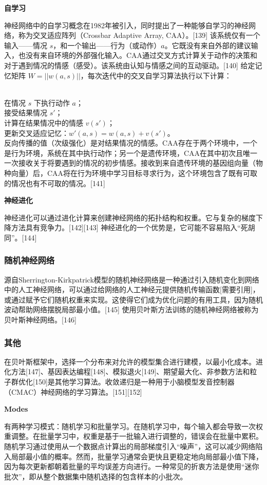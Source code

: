 \textbf{自学习}  

神经网络中的自学习概念在1982年被引入，同时提出了一种能够自学习的神经网络，称为交叉适应阵列（Crossbar Adaptive Array, CAA）。[139] 该系统仅有一个输入——情况 \( s \)，和一个输出——行为（或动作）\( a \)。它既没有来自外部的建议输入，也没有来自环境的外部强化输入。CAA通过交叉方式计算关于动作的决策和对于遇到情况的情感（感受）。该系统由认知与情感之间的互动驱动。[140] 给定记忆矩阵 \( W = ||w(a, s)|| \)，每次迭代中的交叉自学习算法执行以下计算：

\\在情况 \( s \) 下执行动作 \( a \)；\\
接受结果情况 \( s' \)；\\
计算在结果情况中的情感 \( v(s') \)；\\
更新交叉适应记忆：\( w'(a, s) = w(a, s) + v(s') \)。\\

反向传播的值（次级强化）是对结果情况的情感。CAA存在于两个环境中，一个是行为环境，系统在其中执行动作；另一个是遗传环境，CAA在其中初次且唯一一次接收关于将要遇到的情况的初步情感。接收到来自遗传环境的基因组向量（物种向量）后，CAA将在行为环境中学习目标寻求行为，这个环境包含了既有可取的情况也有不可取的情况。[141]

\textbf{神经进化}  
 
神经进化可以通过进化计算来创建神经网络的拓扑结构和权重。它与复杂的梯度下降方法具有竞争力。[142][143] 神经进化的一个优势是，它可能不容易陷入“死胡同”。[144]
\subsubsection{随机神经网络}  
源自Sherrington-Kirkpatrick模型的随机神经网络是一种通过引入随机变化到网络中的人工神经网络，可以通过给网络的人工神经元提供随机传输函数[需要引用]，或通过赋予它们随机权重来实现。这使得它们成为优化问题的有用工具，因为随机波动帮助网络摆脱局部最小值。[145] 使用贝叶斯方法训练的随机神经网络被称为贝叶斯神经网络。[146]
\subsubsection{其他}  
在贝叶斯框架中，选择一个分布来对允许的模型集合进行建模，以最小化成本。进化方法[147]、基因表达编程[148]、模拟退火[149]、期望最大化、非参数方法和粒子群优化[150]是其他学习算法。收敛递归是一种用于小脑模型发音控制器（CMAC）神经网络的学习算法。[151][152]

\textbf{Modes}

有两种学习模式：随机学习和批量学习。在随机学习中，每个输入都会导致一次权重调整。在批量学习中，权重是基于一批输入进行调整的，错误会在批量中累积。随机学习通过使用从一个数据点计算出的局部梯度引入“噪声”，这可以减少网络陷入局部最小值的概率。然而，批量学习通常会更快且更稳定地向局部最小值下降，因为每次更新都朝着批量的平均误差方向进行。一种常见的折衷方法是使用“迷你批次”，即从整个数据集中随机选择的包含样本的小批次。
